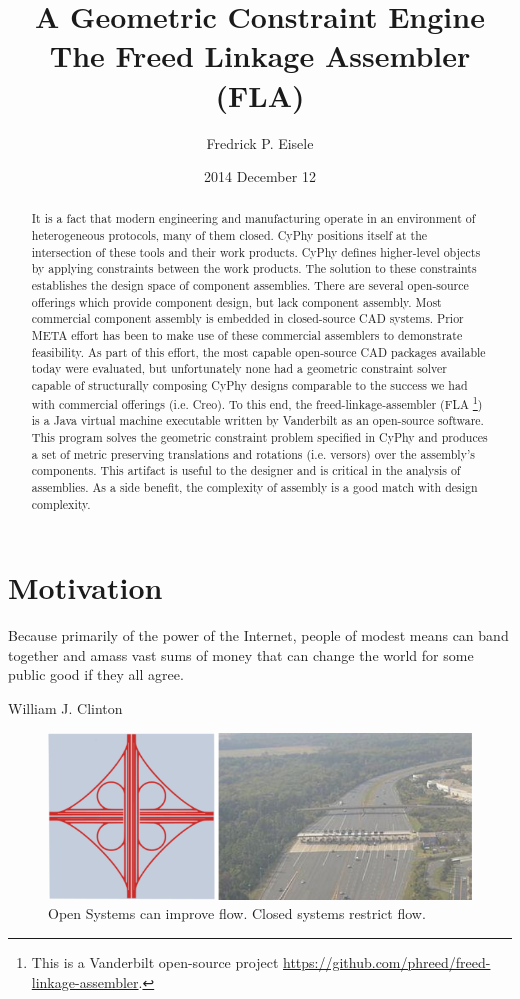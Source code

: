 \documentclass[]{report}
\title{A Geometric Constraint Engine \\
	The Freed Linkage Assembler (FLA)}
\author{Fredrick P. Eisele}
\date{2014 December 12}
\begin{document}
	\maketitle
	
	\begin{abstract}
		It is a fact that modern engineering and manufacturing operate in an environment of heterogeneous protocols, many of them closed. 
		CyPhy positions itself at the intersection of these tools and their work products. 
		CyPhy defines higher-level objects by applying constraints between the work products. 
		The solution to these constraints establishes the design space of component assemblies. 
		There are several open-source offerings which provide component design, but lack component assembly. 
		Most commercial component assembly is embedded in closed-source CAD systems. 
		Prior META effort has been to make use of these commercial assemblers to demonstrate feasibility.  
		As part of this effort, the most capable open-source CAD packages available today were evaluated, 
		but unfortunately none had a geometric constraint solver capable of structurally 
		composing CyPhy designs comparable to the success we had with commercial offerings (i.e. Creo).  
		To this end, the freed-linkage-assembler 
		(FLA \footnote{This is a Vanderbilt open-source project \url{https://github.com/phreed/freed-linkage-assembler}.}) 
		is a Java virtual machine 
		executable written by Vanderbilt as an open-source software. 
		This program solves the geometric constraint problem specified in CyPhy and 
		produces a set of metric preserving translations and rotations (i.e. versors) over the assembly’s components. 
		This artifact is useful to the designer and is critical in the analysis of assemblies. 
		As a side benefit, the complexity of assembly is a good match with design complexity.

	\end{abstract}

\chapter{Motivation}

\epigraph{Because primarily of the power of the Internet, 
people of modest means can band together and amass 
vast sums of money that can change the world 
for some public good if they all agree.}{William J. Clinton}

\begin{figure}[h!]
	\centering
	\includegraphics[scale=0.7]{images/image07}
	\caption{Open Systems can improve flow.  Closed systems restrict flow.}
	\label{fig:open-or-restrict-flow}
\end{figure}
\end{document}

